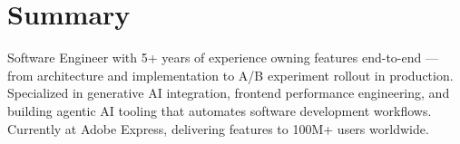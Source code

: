 \documentclass[]{deedy-resume-reversed}
\begin{document}
%
%

%
%

%
%

\begin{minipage}[t]{0.60\textwidth}


\section{Summary}
Software Engineer with 5+ years of experience owning features end-to-end — from architecture and implementation to A/B experiment rollout in production. Specialized in generative AI integration, frontend performance engineering, and building agentic AI tooling that automates software development workflows. Currently at Adobe Express, delivering features to 100M+ users worldwide.
\sectionsep



\end{minipage}
\end{document}
